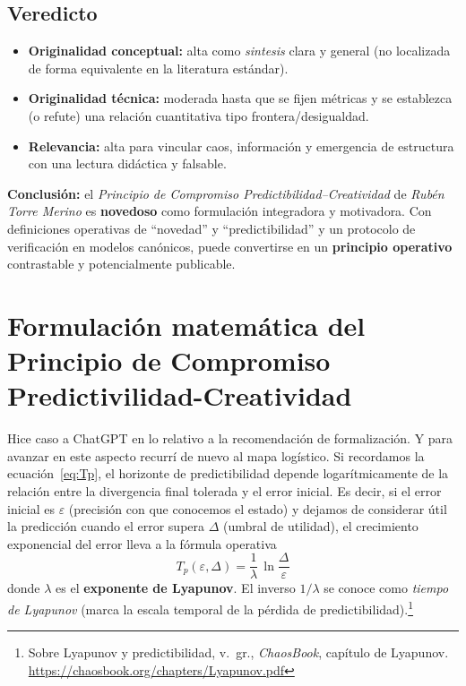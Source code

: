 \documentclass[
  10pt,
  a4paper,
  DIV=11,
  numbers=noendperiod,
  open=any]{scrreprt}
\numberwithin{equation}{chapter}
\numberwithin{equation}{section}
\renewcommand{\[}{\begin{equation}}
\renewcommand{\]}{\end{equation}}
\begin{document}
\subsection{Veredicto}
\begin{itemize}
  \item \textbf{Originalidad conceptual:} alta como \emph{sintesis} clara y general (no localizada de forma equivalente en la literatura estándar).
  \item \textbf{Originalidad técnica:} moderada hasta que se fijen métricas y se establezca (o refute) una relación cuantitativa tipo frontera/desigualdad.
  \item \textbf{Relevancia:} alta para vincular caos, información y emergencia de estructura con una lectura didáctica y falsable.
\end{itemize}

\noindent\textbf{Conclusión:} el \emph{Principio de Compromiso Predictibilidad--Creatividad} de \emph{Rubén Torre Merino} es \textbf{novedoso} como formulación integradora y motivadora. Con definiciones operativas de “novedad” y “predictibilidad” y un protocolo de verificación en modelos canónicos, puede convertirse en un \textbf{principio operativo} contrastable y potencialmente publicable.

\section{Formulación matemática del Principio de Compromiso Predictivilidad-Creatividad}
\label{sec:pcpn-logistico}
Hice caso a ChatGPT en lo relativo a la recomendación de formalización. Y para avanzar en este aspecto recurrí de nuevo al mapa logístico. Si recordamos la ecuación~\eqref{eq:Tp}, el horizonte de predictibilidad depende logarítmicamente de la relación entre la divergencia final tolerada y el error inicial. Es decir, si el error inicial es $\varepsilon$ (precisión con que conocemos el estado) y dejamos de considerar útil la predicción cuando el error supera $\Delta$ (umbral de utilidad), el crecimiento exponencial del error lleva a la fórmula operativa
\[
\boxed{\,T_p(\varepsilon,\Delta)=\frac{1}{\lambda}\,\ln\!\frac{\Delta}{\varepsilon}\,}
\]
donde $\lambda$ es el \textbf{exponente de Lyapunov}. El inverso $1/\lambda$ se conoce como \emph{tiempo de Lyapunov} (marca la escala temporal de la pérdida de predictibilidad).\footnote{Sobre Lyapunov y predictibilidad, v.\ gr., \emph{ChaosBook}, capítulo de Lyapunov. \url{https://chaosbook.org/chapters/Lyapunov.pdf}}
\end{document}
